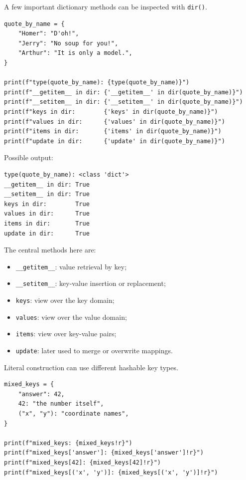 A few important dictionary methods can be inspected with \texttt{dir()}.

\begin{verbatim}
quote_by_name = {
    "Homer": "D'oh!",
    "Jerry": "No soup for you!",
    "Arthur": "It is only a model.",
}

print(f"type(quote_by_name): {type(quote_by_name)}")
print(f"__getitem__ in dir: {'__getitem__' in dir(quote_by_name)}")
print(f"__setitem__ in dir: {'__setitem__' in dir(quote_by_name)}")
print(f"keys in dir:        {'keys' in dir(quote_by_name)}")
print(f"values in dir:      {'values' in dir(quote_by_name)}")
print(f"items in dir:       {'items' in dir(quote_by_name)}")
print(f"update in dir:      {'update' in dir(quote_by_name)}")
\end{verbatim}

Possible output:

\begin{verbatim}
type(quote_by_name): <class 'dict'>
__getitem__ in dir: True
__setitem__ in dir: True
keys in dir:        True
values in dir:      True
items in dir:       True
update in dir:      True
\end{verbatim}

The central methods here are:

\begin{itemize}
    \item \texttt{\_\_getitem\_\_}: value retrieval by key;
    \item \texttt{\_\_setitem\_\_}: key-value insertion or replacement;
    \item \texttt{keys}: view over the key domain;
    \item \texttt{values}: view over the value domain;
    \item \texttt{items}: view over key-value pairs;
    \item \texttt{update}: later used to merge or overwrite mappings.
\end{itemize}

Literal construction can use different hashable key types.

\begin{verbatim}
mixed_keys = {
    "answer": 42,
    42: "the number itself",
    ("x", "y"): "coordinate names",
}

print(f"mixed_keys: {mixed_keys!r}")
print(f"mixed_keys['answer']: {mixed_keys['answer']!r}")
print(f"mixed_keys[42]: {mixed_keys[42]!r}")
print(f"mixed_keys[('x', 'y')]: {mixed_keys[('x', 'y')]!r}")
\end{verbatim}


